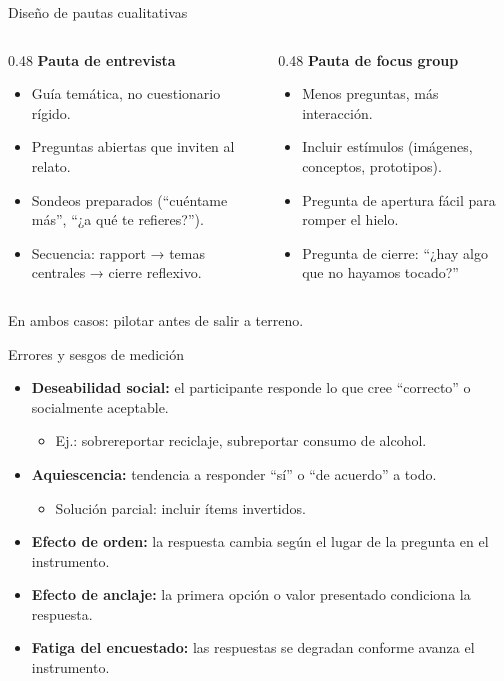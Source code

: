 \documentclass[aspectratio=169, 12pt]{beamer}
\begin{document}
\begin{frame}{Diseño de pautas cualitativas}
  \begin{columns}[T]
    \begin{column}{0.48\textwidth}
      \textbf{\color{daMagenta}Pauta de entrevista}
      \begin{itemize}
        \small
        \item Guía temática, no cuestionario rígido.
        \item Preguntas abiertas que inviten al relato.
        \item Sondeos preparados (``cuéntame más'', ``¿a qué te refieres?'').
        \item Secuencia: rapport → temas centrales → cierre reflexivo.
      \end{itemize}
    \end{column}
    \begin{column}{0.48\textwidth}
      \textbf{\color{daPurpleLight}Pauta de focus group}
      \begin{itemize}
        \small
        \item Menos preguntas, más interacción.
        \item Incluir estímulos (imágenes, conceptos, prototipos).
        \item Pregunta de apertura fácil para romper el hielo.
        \item Pregunta de cierre: ``¿hay algo que no hayamos tocado?''
      \end{itemize}
    \end{column}
  \end{columns}
  \vspace{0.3cm}
  {\small En ambos casos: \alert{pilotar} antes de salir a terreno.}
\end{frame}

\begin{frame}{Errores y sesgos de medición}
  \begin{itemize}
    \item \textbf{Deseabilidad social:} el participante responde lo que cree ``correcto'' o socialmente aceptable.
    \begin{itemize}
      \item {\small Ej.: sobrereportar reciclaje, subreportar consumo de alcohol.}
    \end{itemize}
    \item \textbf{Aquiescencia:} tendencia a responder ``sí'' o ``de acuerdo'' a todo.
    \begin{itemize}
      \item {\small Solución parcial: incluir ítems invertidos.}
    \end{itemize}
    \item \textbf{Efecto de orden:} la respuesta cambia según el lugar de la pregunta en el instrumento.
    \item \textbf{Efecto de anclaje:} la primera opción o valor presentado condiciona la respuesta.
    \item \textbf{Fatiga del encuestado:} las respuestas se degradan conforme avanza el instrumento.
  \end{itemize}
\end{frame}
\end{document}
